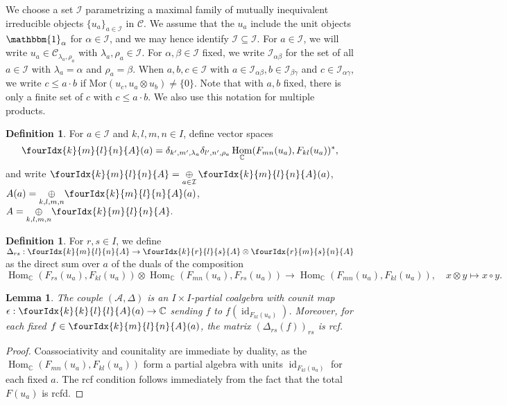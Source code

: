 \documentclass[10pt]{article}
\DeclareMathOperator{\id}{id}
\DeclareMathOperator{\Hom}{Hom}
\newcommand{\C}{\mathbb{C}}
\newcommand{\CatC}{\mathcal{C}}
\newcommand{\Mor}{\mathrm{Mor}}
\newcommand{\Unitb}{\mathbbm{1}}
\newcommand{\Gr}[5]{\fourIdx{#2}{#4}{#3}{#5}{#1}}%
\newtheorem{Lem}[Theorem]{Lemma}
\theoremstyle{definition}
\newtheorem{Def}[Theorem]{Definition}
\numberwithin{equation}{section}
\begin{document}
We choose a set $\mathcal{I}$ parametrizing a maximal family of mutually inequivalent irreducible objects $\{u_a\}_{a\in \mathcal{I}}$ in $\CatC$. We assume that the $u_a$ include the unit objects $\Unitb_{\alpha}$ for $\alpha\in \mathscr{I}$, and we may hence identify $\mathscr{I}\subseteq \mathcal{I}$. For $a\in \mathcal{I}$, we will write $u_a \in \CatC_{\lambda_a,\rho_a}$ with $\lambda_a,\rho_a\in \mathscr{I}$. For $\alpha,\beta\in \mathscr{I}$ fixed, we write $\mathcal{I}_{\alpha\beta}$ for the set of all $a\in \mathcal{I}$ with $\lambda_a=\alpha$ and $\rho_a=\beta$. When $a,b,c\in \mathcal{I}$ with $a\in \mathcal{I}_{\alpha\beta},b\in \mathcal{I}_{\beta\gamma}$ and $c\in \mathcal{I}_{\alpha\gamma}$, we write $c\leq a\cdot b$ if $\Mor(u_c,u_a\otimes u_b)\neq \{0\}$. Note that with $a,b$ fixed, there is only a finite set of $c$ with $c\leq a\cdot b$. We also use this notation for multiple products.

\begin{Def} For $a\in \mathcal{I}$ and $k,l,m,n\in I$, define vector
  spaces \[\Gr{A}{k}{l}{m}{n}(a) =
  \delta_{k',m',\lambda_a}\delta_{l',n',\rho_a}
  \Hom_{\C}(F_{mn}(u_a),F_{kl}(u_a))^*,\] and write
  $\Gr{A}{k}{l}{m}{n} =\underset{a\in \mathcal{I}}{\oplus}\,
  \Gr{A}{k}{l}{m}{n}(a)$, $ A(a) = \underset{k,l,m,n}{\oplus}
  \Gr{A}{k}{l}{m}{n}(a)$, $A = \underset{k,l,m,n}{\oplus} \Gr{A}{k}{l}{m}{n}.$
\end{Def} 


\begin{Def} For $r,s\in I$, we define $\Delta_{rs}: \Gr{A}{k}{l}{m}{n}\rightarrow \Gr{A}{k}{l}{r}{s}\otimes \Gr{A}{r}{s}{m}{n}$ as the direct sum over $a$ of the duals of the composition \[\Hom_{\C}(F_{rs}(u_a),F_{kl}(u_a)) \otimes \Hom_{\C}(F_{mn}(u_a),F_{rs}(u_a))\rightarrow \Hom_{\C}(F_{mn}(u_a),F_{kl}(u_a)),\quad x\otimes y \mapsto x\circ y.\]
\end{Def} 

\begin{Lem} The couple $(\mathscr{A},\Delta)$ is an $I\times
  I$-partial coalgebra with counit map $\epsilon:\Gr{A}{k}{l}{k}{l}(a)\rightarrow \C$ sending $f$ to $f(\id_{F_{kl}(u_a)})$. Moreover, for each fixed $f\in \Gr{A}{k}{l}{m}{n}(a)$, the matrix $\left(\Delta_{rs}(f)\right)_{rs}$ is rcf.
\end{Lem} 
\begin{proof} Coassociativity and counitality are immediate by duality, as the $\Hom_{\C}(F_{mn}(u_a),F_{kl}(u_a))$ form a partial algebra with units $\id_{F_{kl}(u_a)}$ for each fixed $a$. The rcf condition follows immediately from the fact that the total $F(u_a)$ is rcfd.
\end{proof}
\end{document}
